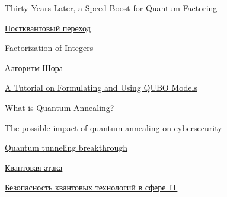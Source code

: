 \documentclass[12pt]{article}
\begin{document}
\begin{thebibliography}{6}
     \href{https://www.quantamagazine.org/thirty-years-later-a-speed-boost-for-quantum-factoring-20231017/}{Thirty Years Later, a Speed Boost for Quantum Factoring}

     \href{https://www.gazprombank.tech/blog/694}{Постквантовый переход}
    
     \href{https://www.theoremoftheday.org/MathsStudyGroup/ADF37A.pdf}{Factorization of Integers}
    
     \href{https://qsim.tsu.ru/lectures/Shor's_algorithm}{Алгоритм Шора} 

     \href{https://wigner.hu/~koniorczykmatyas/qubo/literature/1811.11538.pdf}{A Tutorial on Formulating and Using QUBO Models}

     \href{https://docs.dwavesys.com/docs/latest/c_gs_2.html}{What is Quantum Annealing?}

     \href{https://sd-magazine.eu/index.php/sd/article/download/216/167/}{The possible impact of quantum annealing on cybersecurity}

     \href{https://nattothoughts.substack.com/p/chinas-quantum-tunneling-breakthrough}{Quantum tunneling breakthrough}

     \href{https://qapp.tech/help/quantum-threat}{Квантовая атака}

     \href{https://www.ptsecurity.com/ru-ru/research/analytics/bezopasnost-kvantovyh-technologiy-v-sphere-it/}{Безопасность квантовых технологий в сфере IT}

\end{thebibliography}
\end{document}
